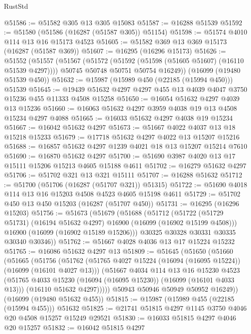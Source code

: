 \begin{lexlean}{RustStd}
\begin{coremodule}
@51586 := @51582 @305 @13 @305 @15083
@51587 := @16288 @51539
@51592 := @51580 (@51586 (@16287 (@51587 @305)) @51154)
@51598 := @51574 @4010 @114 @13 @16 @15173 @4523
@51605 := @51582 @369 @13 @369 @15173 (@16287 (@51587 @369))
@51607 := @16295 (@16296 @15173)
@51626 := @51552
    (@51557
      (@51567
        (@51572 (@51592 (@51598 (@51605 @51607) (@16110 @51539 @4297))))
        @50745
        @50748
        @50751
        @50754
        @16249))
    (@16099 (@19480 @51539 @450))
@51632 := @15987 (@15989 @450 (@22185 (@15994 @450))) @51539
@51645 := @19439 @51632 @4297 @4297 @455 @13 @4039 @4047 @3750 @15236 @455 @11333 @4508 @15258
@51650 := @16054 @51632 @4297 @4039 @13 @15236
@51660 := @16063 @51632 @4297 @3959 @4038 @19 @13 @4508 @15234 @4297 @4088
@51665 := @16033 @51632 @4297 @4038 @19 @15234
@51667 := @16042 @51632 @4297
@51673 := @51667 @4022 @4037 @13 @18 @15218 @15233
@51679 := @17718 @51632 @4297 @4022 @13 @15207 @15216
@51688 := @16857 @51632 @4297 @1239 @4021 @18 @13 @15207 @15214 @7610
@51690 := @16870 @51632 @4297
@51700 := @51690 @3987 @4020 @13 @17 @15111 @15206 @15213 @4605 @15188 @4611
@51702 := @16279 @51632 @4297
@51706 := @51702 @321 @13 @321 @15111
@51707 := @16288 @51632
@51712 := @51700 (@51706 (@16287 (@51707 @321)) @51315)
@51722 := @51690 @4018 @114 @13 @16 @15203 @4508 @4523 @4605 @15198 @4611
@51729 := @51702 @450 @13 @450 @15203 (@16287 (@51707 @450))
@51731 := @16295 (@16296 @15203)
@51756 := @51673
    (@51679
      (@51688
        (@51712
          (@51722 (@51729 @51731) (@16194 @51632 @4297) @16900 (@16099 (@16902 @15199 @4508)))
          @16900
          (@16099 (@16902 @15189 @15206)))
        @30325
        @30328
        @30331
        @30335
        @30340
        @30346))
@51762 := @51667 @4028 @4036 @13 @17 @15224 @15232
@51765 := @16086 @51632 @4297 @13
@51809 := @51645
    (@51650
      (@51660
        (@51665
          (@51756
            (@51762
              (@51765 @4027 @15224 (@16094 (@16095 @15224)) (@16099 (@16101 @4027 @13)))
              (@51667
                @4034
                @114
                @13
                @16
                @15230
                @4523
                (@51765 @4033 @15230 (@16094 (@16095 @15230)) (@16099 (@16101 @4033 @13)))
                (@16110 @51632 @4297)))))
        @50943
        @50946
        @50949
        @50952
        @16249))
    (@16099 (@19480 @51632 @455))
@51815 := @15987 (@15989 @455 (@22185 (@15994 @455))) @51632
@51825 := @21741 @51815 @4297 @1145 @3750 @4046 @20 @4508 @15257 @15249 @29521
@51830 := @16033 @51815 @4297 @4046 @20 @15257
@51832 := @16042 @51815 @4297

\end{coremodule}
\end{lexlean}
